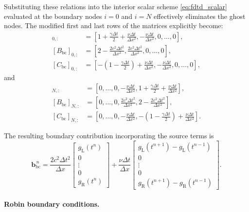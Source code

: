 \documentclass{Configuration_Files/PoliMi3i_thesis}
\begin{document}
Substituting these relations into the interior scalar scheme \eqref{eq:fdtd_scalar} evaluated at the boundary nodes $i=0$ and $i=N$ effectively eliminates the ghost nodes. The modified first and last rows of the matrices explicitly become:
\begin{align*}
[A_{\mathrm{bc}}]_{0, :} &= \left[ 1+\frac{\gamma\Delta t}{2}+\frac{\nu\Delta t}{\Delta x^2}, -\frac{\nu\Delta t}{\Delta x^2}, 0, \dots, 0 \right], \\
[B_{\mathrm{bc}}]_{0, :} &= \left[ 2-\frac{2c^2\Delta t^2}{\Delta x^2}, \frac{2c^2\Delta t^2}{\Delta x^2}, 0, \dots, 0 \right], \\
[C_{\mathrm{bc}}]_{0, :} &= \left[ -\left(1-\frac{\gamma\Delta t}{2}\right) + \frac{\nu\Delta t}{\Delta x^2}, -\frac{\nu\Delta t}{\Delta x^2}, 0, \dots, 0 \right],
\end{align*}
and
\begin{align*}
[A_{\mathrm{bc}}]_{N, :} &= \left[ 0, \dots, 0, -\frac{\nu\Delta t}{\Delta x^2}, 1+\frac{\gamma\Delta t}{2}+\frac{\nu\Delta t}{\Delta x^2} \right], \\
[B_{\mathrm{bc}}]_{N, :} &= \left[ 0, \dots, 0, \frac{2c^2\Delta t^2}{\Delta x^2}, 2-\frac{2c^2\Delta t^2}{\Delta x^2} \right], \\
[C_{\mathrm{bc}}]_{N, :} &= \left[ 0, \dots, 0, -\frac{\nu\Delta t}{\Delta x^2}, -\left(1-\frac{\gamma\Delta t}{2}\right) + \frac{\nu\Delta t}{\Delta x^2} \right].
\end{align*}

The resulting boundary contribution incorporating the source terms is
\begin{equation*}
\mathbf{b}_{\mathrm{bc}}^{\,n}
=
\frac{2c^2\Delta t^2}{\Delta x}
\begin{bmatrix}
g_{\mathrm L}(t^n) \\
0 \\
\vdots \\
0 \\
g_{\mathrm R}(t^n)
\end{bmatrix}
+
\frac{\nu\Delta t}{\Delta x}
\begin{bmatrix}
g_{\mathrm L}(t^{n+1}) - g_{\mathrm L}(t^{n-1}) \\
0 \\
\vdots \\
0 \\
g_{\mathrm R}(t^{n+1}) - g_{\mathrm R}(t^{n-1})
\end{bmatrix}.
\end{equation*}

\paragraph{Robin boundary conditions.}
\end{document}
